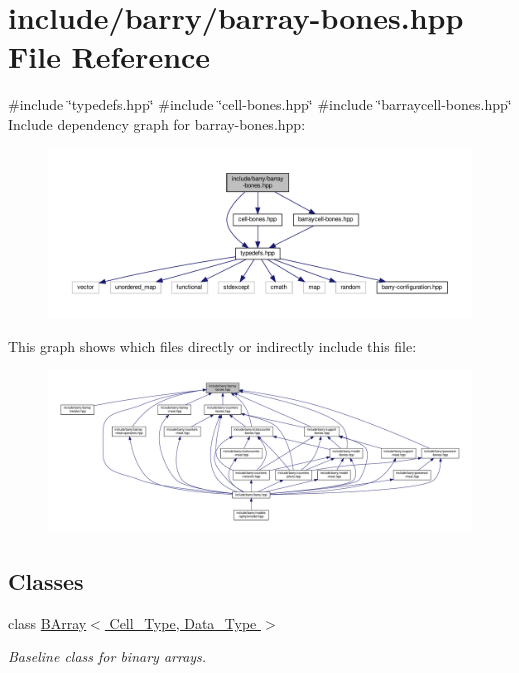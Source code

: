 \hypertarget{barray-bones_8hpp}{}\section{include/barry/barray-\/bones.hpp File Reference}
\label{barray-bones_8hpp}
{\ttfamily \#include \char`\"{}typedefs.\+hpp\char`\"{}}\newline
{\ttfamily \#include \char`\"{}cell-\/bones.\+hpp\char`\"{}}\newline
{\ttfamily \#include \char`\"{}barraycell-\/bones.\+hpp\char`\"{}}\newline
Include dependency graph for barray-\/bones.hpp\+:
\nopagebreak
\begin{figure}[H]
\begin{center}
\leavevmode
\includegraphics[width=350pt]{barray-bones_8hpp__incl}
\end{center}
\end{figure}
This graph shows which files directly or indirectly include this file\+:
\nopagebreak
\begin{figure}[H]
\begin{center}
\leavevmode
\includegraphics[width=350pt]{barray-bones_8hpp__dep__incl}
\end{center}
\end{figure}
\subsection*{Classes}
\begin{DoxyCompactItemize}
\item 
class \hyperlink{class_b_array}{B\+Array$<$ Cell\+\_\+\+Type, Data\+\_\+\+Type $>$}
\begin{DoxyCompactList}\small\item\em Baseline class for binary arrays. \end{DoxyCompactList}\end{DoxyCompactItemize}
